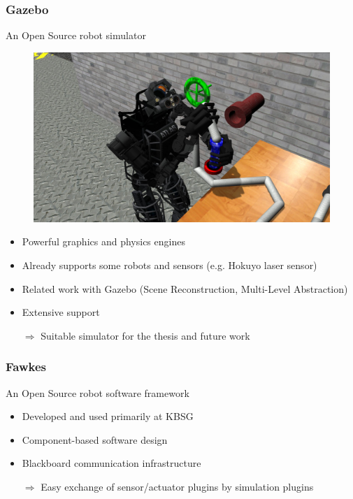 \documentclass[]{beamer}
\begin{document}
\begin{frame}
\frametitle{Gazebo}
\begin{multicols}{2}
An Open Source robot simulator
\begin{figure}
\includegraphics[scale=0.13]{pics/gazebo.jpg}
\end{figure}
\begin{itemize}
\item Powerful graphics and physics engines %
\item Already supports some robots and sensors (e.g. Hokuyo laser sensor)
\item Related work with Gazebo (Scene Reconstruction, Multi-Level Abstraction)
\item Extensive support
\end{itemize}
\end{multicols}
\pause
\begin{itemize}
\item[$\Rightarrow$] Suitable simulator for the thesis and future work
\end{itemize}
\end{frame}

\begin{frame}
\frametitle{Fawkes}
\begin{multicols}{2}
\begin{figure}
\end{figure}
An Open Source robot software framework
\begin{itemize}
\item Developed and used primarily at KBSG
\item Component-based software design
\item Blackboard communication infrastructure%
\pause
\end{itemize}
\end{multicols}
\begin{itemize}
\item[$\Rightarrow$] Easy exchange of sensor/actuator plugins by simulation plugins
\end{itemize}
\end{frame}
\end{document}

